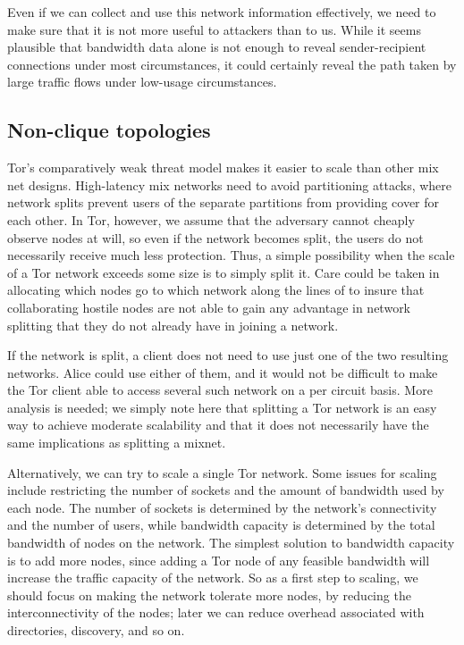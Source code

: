 \documentclass{llncs}
\begin{document}

Even if we can collect and use this network information effectively, we need
to make sure that it is not more useful to attackers than to us.  While it
seems plausible that bandwidth data alone is not enough to reveal
sender-recipient connections under most circumstances, it could certainly
reveal the path taken by large traffic flows under low-usage circumstances.

\subsection{Non-clique topologies}

Tor's comparatively weak threat model makes it easier to scale than
other mix net
designs.  High-latency mix networks need to avoid partitioning attacks, where
network splits prevent users of the separate partitions from providing cover
for each other.  In Tor, however, we assume that the adversary cannot
cheaply observe nodes at will, so even if the network becomes split, the
users do not necessarily receive much less protection.
Thus, a simple possibility when the scale of a Tor network
exceeds some size is to simply split it. Care could be taken in
allocating which nodes go to which network along the lines of
\cite{casc-rep} to insure that collaborating hostile nodes are not
able to gain any advantage in network splitting that they do not
already have in joining a network.

If the network is split, 
a client does not need to use just one of the two resulting networks.
Alice could use either of them, and it would not be difficult to make
the Tor client able to access several such network on a per circuit
basis. More analysis is needed; we simply note here that splitting
a Tor network is an easy way to achieve moderate scalability and that
it does not necessarily have the same implications as splitting a mixnet.

Alternatively, we can try to scale a single Tor network.  Some issues for
scaling include restricting the number of sockets and the amount of bandwidth
used by each node.  The number of sockets is determined by the network's
connectivity and the number of users, while bandwidth capacity is determined
by the total bandwidth of nodes on the network.  The simplest solution to
bandwidth capacity is to add more nodes, since adding a Tor node of any
feasible bandwidth will increase the traffic capacity of the network.  So as
a first step to scaling, we should focus on making the network tolerate more
nodes, by reducing the interconnectivity of the nodes; later we can reduce
overhead associated with directories, discovery, and so on.
\end{document}
